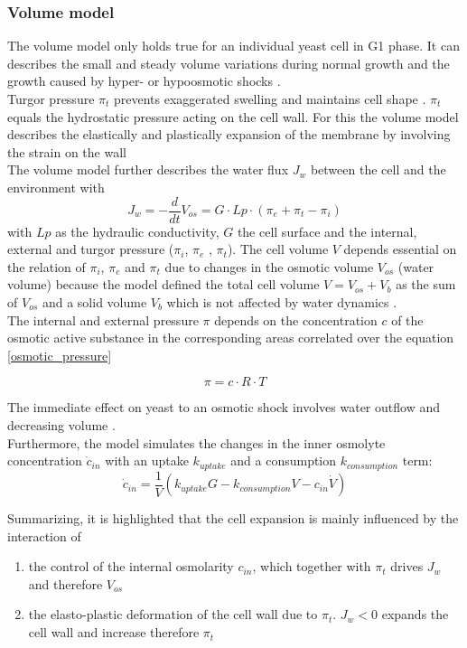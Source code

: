 \subsubsection{Volume model}
The volume model only holds true for an individual yeast cell in G1 phase. It can describes the small and steady volume variations during normal growth and the growth caused by hyper- or hypoosmotic shocks \cite{volumeModel}.\\
Turgor pressure $\pi_t$ prevents exaggerated swelling and maintains cell shape \cite{volumeModel}. $\pi_t$ equals the hydrostatic pressure acting on the cell wall. For this the volume model describes the elastically and plastically expansion of the membrane by involving the strain on the wall\\
The volume model further describes the water flux $J_w$ between the cell and the environment with 
\begin{equation}\label{waterFlux}
	J_{w} = - \frac{d}{dt} V_{os} = G \cdot Lp \cdot (\pi_e + \pi_t - \pi_i)
\end{equation}
with $Lp$ as the hydraulic conductivity, $G$ the cell surface and the internal, external and turgor pressure  ($\pi_i$, $\pi_e$ , $\pi_t$). 
The cell volume $V$ depends essential on the relation of $\pi_i$, $\pi_e$ and $\pi_t$ due to changes in the osmotic volume $V_{os}$ (water volume) because the model defined the total cell volume $V = V_{os} + V_b$ as the sum of $V_{os}$ and a solid volume $V_b$ which is not affected by water dynamics \cite{volumeModel}. \\ 
The internal and external pressure $\pi$ depends on the concentration $c$ of the osmotic active substance in the corresponding areas correlated over the equation \ref{osmotic_pressure}

\begin{equation} \label{osmotic_pressure}
	\pi = c \cdot R \cdot T	
\end{equation} 

The immediate effect on yeast to an osmotic shock involves water outflow and decreasing volume \cite{ASimpleMathematicalModel}.\\ 
Furthermore, the model simulates the changes in the inner osmolyte concentration $\dot c_{in}$ with an uptake $k_{uptake}$ and a consumption $k_{consumption}$ term:
\begin{equation*}
	\dot c_{in} = \frac{1}{V}(k_{uptake}G - k_{consumption}V-c_{in} \dot V)
\end{equation*}

Summarizing, it is highlighted that the cell expansion is mainly influenced by the interaction of
\begin{enumerate}
	\item the control of the internal osmolarity $c_{in}$, which together with $\pi_t$ drives $J_w$ and therefore $V_{os}$
	\item the elasto-plastic deformation of the cell wall due to $\pi_t$. $J_w < 0$ expands the cell wall and increase therefore $\pi_t$
\end{enumerate}



